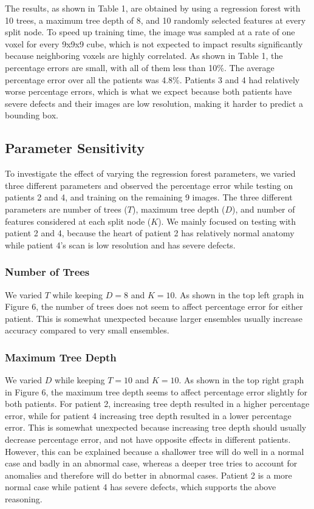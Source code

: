 The results, as shown in Table 1, are obtained by using a regression forest with 10 trees, a maximum tree depth of 8, and 10 randomly selected features at every split node. To speed up training time, the image was sampled at a rate of one voxel for every 9x9x9 cube, which is not expected to impact results significantly because neighboring voxels are highly correlated. As shown in Table 1, the percentage errors are small, with all of them less than 10\%. The average percentage error over all the patients was 4.8\%. Patients 3 and 4 had relatively worse percentage errors, which is what we expect because both patients have severe defects and their images are low resolution, making it harder to predict a bounding box.

\subsection{Parameter Sensitivity}
To investigate the effect of varying the regression forest parameters, we varied three different parameters and observed the percentage error while testing on patients 2 and 4, and training on the remaining 9 images. The three different parameters are number of trees ($T$), maximum tree depth ($D$), and number of features considered at each split node ($K$). We mainly focused on testing with patient 2 and 4, because the heart of patient 2 has relatively normal anatomy while patient 4's scan is low resolution and has severe defects.

\subsubsection{Number of Trees} We varied $T$ while keeping $D=8$ and $K=10$. As shown in the top left graph in Figure 6, the number of trees does not seem to affect percentage error for either patient. This is somewhat unexpected because larger ensembles usually increase accuracy compared to very small ensembles.

\subsubsection{Maximum Tree Depth} We varied $D$ while keeping $T=10$ and $K=10$. As shown in the top right graph in Figure 6, the maximum tree depth seems to affect percentage error slightly for both patients. For patient 2, increasing tree depth resulted in a higher percentage error, while for patient 4 increasing tree depth resulted in a lower percentage error. This is somewhat unexpected because increasing tree depth should usually decrease percentage error, and not have opposite effects in different patients. However, this can be explained because a shallower tree will do well in a normal case and badly in an abnormal case, whereas a deeper tree tries to account for anomalies and therefore will do better in abnormal cases. Patient 2 is a more normal case while patient 4 has severe defects, which supports the above reasoning.

